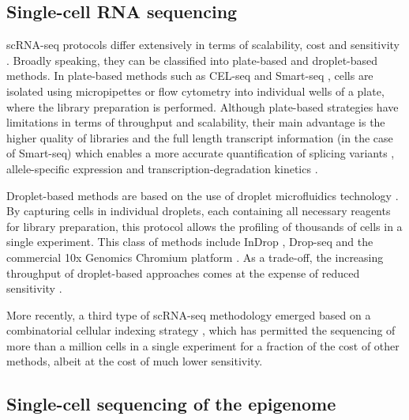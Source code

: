 \subsection{Single-cell RNA sequencing} \label{section:rna_expresssion}

scRNA-seq protocols differ extensively in terms of scalability, cost and sensitivity \cite{Svensson2018, Lafzi2018}. Broadly speaking, they can be classified into plate-based and droplet-based methods. In plate-based methods such as CEL-seq \cite{Hashimshony2012} and Smart-seq \cite{Ramskold2012, Picelli2014}, cells are isolated using micropipettes or flow cytometry into individual wells of a plate, where the library preparation is performed. Although plate-based strategies have limitations in terms of throughput and scalability, their main advantage is the higher quality of libraries and the full length transcript information (in the case of Smart-seq) which enables a more accurate quantification of splicing variants \cite{Huang2017}, allele-specific expression \cite{Deng2014} and transcription-degradation kinetics \cite{LaManno2018}.
	
Droplet-based methods are based on the use of droplet microfluidics technology \cite{Zhang2019}. By capturing cells in individual droplets, each containing all necessary reagents for library preparation, this protocol allows the profiling of thousands of cells in a single experiment. This class of methods include InDrop \cite{Klein2015,Zilionis2016}, Drop-seq \cite{Macosko2015} and the commercial 10x Genomics Chromium platform \cite{Zheng2017}. As a trade-off, the increasing throughput of droplet-based approaches comes at the expense of reduced sensitivity \cite{Ziegenhain2017,Wang2019a,Svensson2017}.

More recently, a third type of scRNA-seq methodology emerged based on a combinatorial cellular indexing strategy \cite{Cao2017,Rosenberg2018,Cao2019}, which has permitted the sequencing of more than a million cells in a single experiment for a fraction of the cost of other methods, albeit at the cost of much lower sensitivity.

\subsection{Single-cell sequencing of the epigenome}

